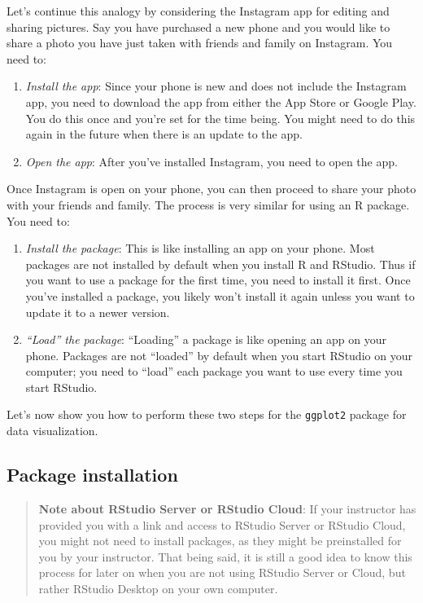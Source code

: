 \documentclass[]{book}
\providecommand{\tightlist}{%
  \setlength{\itemsep}{0pt}\setlength{\parskip}{0pt}}
\begin{document}
Let's continue this analogy by considering the Instagram app for editing and sharing pictures. Say you have purchased a new phone and you would like to share a photo you have just taken with friends and family on Instagram. You need to:

\begin{enumerate}
\def\labelenumi{\arabic{enumi}.}
\tightlist
\item
  \emph{Install the app}: Since your phone is new and does not include the Instagram app, you need to download the app from either the App Store or Google Play. You do this once and you're set for the time being. You might need to do this again in the future when there is an update to the app.
\item
  \emph{Open the app}: After you've installed Instagram, you need to open the app.
\end{enumerate}

Once Instagram is open on your phone, you can then proceed to share your photo with your friends and family. The process is very similar for using an R package. You need to:

\begin{enumerate}
\def\labelenumi{\arabic{enumi}.}
\tightlist
\item
  \emph{Install the package}: This is like installing an app on your phone. Most packages are not installed by default when you install R and RStudio. Thus if you want to use a package for the first time, you need to install it first. Once you've installed a package, you likely won't install it again unless you want to update it to a newer version.
\item
  \emph{``Load'' the package}: ``Loading'' a package is like opening an app on your phone. Packages are not ``loaded'' by default when you start RStudio on your computer; you need to ``load'' each package you want to use every time you start RStudio.
\end{enumerate}

Let's now show you how to perform these two steps for the \texttt{ggplot2} package for data visualization.

\hypertarget{package-installation}{%
\subsection{Package installation}\label{package-installation}}

\begin{quote}
\textbf{Note about RStudio Server or RStudio Cloud}: If your instructor has provided you with a link and access to RStudio Server or RStudio Cloud, you might not need to install packages, as they might be preinstalled for you by your instructor. That being said, it is still a good idea to know this process for later on when you are not using RStudio Server or Cloud, but rather RStudio Desktop on your own computer.
\end{quote}
\end{document}
